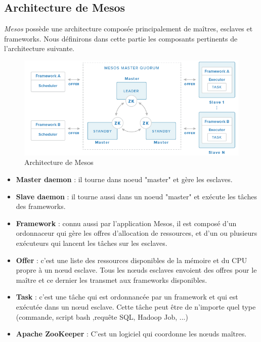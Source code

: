 \begin{onehalfspace}
\subsection{Architecture de Mesos}
\emph{Mesos} possède une architecture composée principalement de maîtres, esclaves et frameworks. Nous définirons dans cette partie les composants pertinents de l'architecture suivante.
\begin{figure}[H]
\centering
\includegraphics [scale=0.65]{chapitre3/assets/mesosarch.png}
\caption{Architecture de Mesos \cite{mesos1}}
\end{figure}
\begin{itemize}
\item \textbf{Master daemon} : il tourne dans noeud "master" et gère les esclaves.
\item \textbf{Slave daemon} : il tourne aussi dans un noeud "master" et exécute les tâches des frameworks.
\item \textbf{Framework} : connu aussi par l'application Mesos, il est composé d'un ordonnaceur qui gère les offres d'allocation de ressources, et d'un ou plusieurs exécuteurs qui lancent les tâches sur les esclaves.
\item \textbf{Offer} : c'est une liste des ressources disponibles de la mémoire et du CPU propre à un nœud esclave. Tous les nœuds esclaves envoient des offres pour le maître  et ce dernier les transmet aux frameworks disponibles.
\item  \textbf{Task} : c'est une tâche qui est ordonnancée par un framework et qui est exécutée dans un nœud esclave. Cette tâche peut être de n'importe quel type (commande, script bash ,requête SQL, Hadoop Job, ...)
\item \textbf{Apache ZooKeeper }: C'est un logiciel qui coordonne les nœuds maîtres.
\end{itemize}

\end{onehalfspace}
